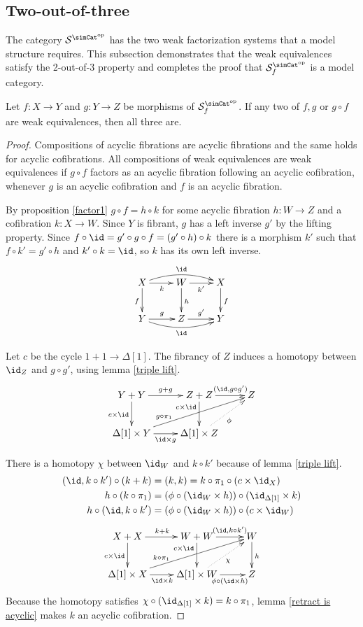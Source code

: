 \documentclass{tac}
\newcommand\cat\mathcal
\newcommand\dual{^{\mathrm{op}}}
\newcommand\s{^{\simCat\dual}}
\newcommand\of{:}
\newcommand\simplex\Delta
\newcommand\f{_f}
\begin{document}
\subsection{Two-out-of-three}
The category $\cat S\s$ has the two weak factorization systems that a model structure requires. This subsection demonstrates that the weak equivalences satisfy the 2-out-of-3 property and completes the proof that $\cat S\s\f$ is a model category.

\begin{lemma}[2-out-of-3] Let $f\of X\to Y$ and $g\of Y\to Z$ be morphisms of $\cat S\s\f$. If any two of $f,g$ or $g\circ f$ are weak equivalences, then all three are. \label{toot}\end{lemma}

\begin{proof}
Compositions of acyclic fibrations are acyclic fibrations and the same holds for acyclic cofibrations. All compositions of weak equivalences are weak equivalences if $g\circ f$ factors as an acyclic fibration following an acyclic cofibration, whenever $g$ is an acyclic cofibration and $f$ is an acyclic fibration.

By proposition \ref{factor1} $g\circ f=h\circ k$ for some acyclic fibration $h\of W\to Z$ and a cofibration $k\of X\to W$. Since $Y$ is fibrant, $g$ has a left inverse $g'$ by the lifting property. Since $f \circ \id = g'\circ g\circ f= (g'\circ h)\circ k$ there is a morphism $k'$ such that $f\circ k' = g'\circ h$ and $k'\circ k = \id$, so $k$ has its own left inverse.
\[\xymatrix{
X\ar[d]_f \ar[r]_{k} \ar@/^2ex/[rr]^{\id} & W\ar[d]^h \ar[r]_{k'} & X\ar[d]^f\\
Y \ar[r]^{g} \ar@/_2ex/[rr]_{\id} & Z \ar[r]^{g'} & Y
}\]

Let $c$ be the cycle $1+1\to\simplex[1]$. The fibrancy of $Z$ induces a homotopy between $\id_Z$ and $g\circ g'$, using lemma \ref{triple lift}.
\[\xymatrix{
Y+Y\ar[r]^{g+g}\ar[d]_{c\times\id} & Z+Z\ar[r]^(.6){(\id,g\circ g')}\ar[d]_(.3){c\times\id} & Z\\
\simplex[1]\times Y\ar[r]_{\id\times g}\ar[urr]^(.3){g\circ\pi_1} & \simplex[1]\times Z\ar@{.>}[ur]_{\phi}
}\]

There is a homotopy $\chi$ between $\id_W$ and $k\circ k'$ because of lemma \ref{triple lift}.
\begin{align*}
(\id, k\circ k')\circ (k+k) &= (k,k) = k\circ \pi_1\circ(c\times\id_X)\\
h\circ (k \circ \pi_1) &= (\phi\circ (\id_W\times h))\circ (\id_{\simplex[1]} \times k)\\
h\circ (\id, k\circ k') &= (\phi\circ (\id_W\times h))\circ (c\times \id_W)
\end{align*}
\[\xymatrix{
X+X\ar[d]_{c\times \id}\ar[r]^{k+k} & W+W\ar[d]_(.3){c\times \id}\ar[r]^(.6){(\id,k\circ k')} & W\ar[d]^h\\
\simplex[1]\times X\ar[r]_{\id\times k} \ar[urr]^(.3){k\circ \pi_1}  & \simplex[1]\times W\ar[r]_(.6){\phi\circ (\id\times h)} \ar@{.>}[ur]_\chi & Z
}\]
Because the homotopy satisfies $\chi\circ(\id_{\simplex[1]}\times k) = k\circ \pi_1$, lemma \ref{retract is acyclic} makes $k$ an acyclic cofibration.


\end{proof}
\end{document}
